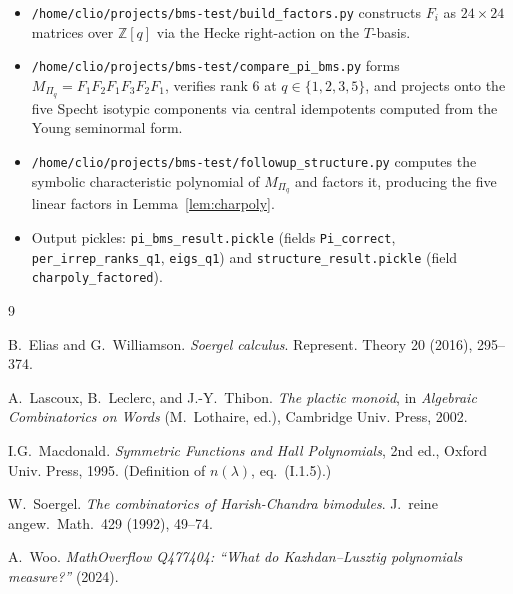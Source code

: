 \documentclass[11pt]{article}
\theoremstyle{definition}
\begin{document}
\begin{itemize}
\item \texttt{/home/clio/projects/bms-test/build\_factors.py} constructs
$F_i$ as $24\times 24$ matrices over $\mathbb{Z}[q]$ via the Hecke
right-action on the $T$-basis.

\item \texttt{/home/clio/projects/bms-test/compare\_pi\_bms.py} forms
$M_{\Pi_q} = F_1 F_2 F_1 F_3 F_2 F_1$, verifies rank $6$ at
$q \in \{1,2,3,5\}$, and projects onto the five Specht isotypic components
via central idempotents computed from the Young seminormal form.

\item \texttt{/home/clio/projects/bms-test/followup\_structure.py}
computes the symbolic characteristic polynomial of $M_{\Pi_q}$ and factors
it, producing the five linear factors in Lemma~\ref{lem:charpoly}.

\item Output pickles: \texttt{pi\_bms\_result.pickle} (fields
\texttt{Pi\_correct}, \texttt{per\_irrep\_ranks\_q1},
\texttt{eigs\_q1}) and \texttt{structure\_result.pickle} (field
\texttt{charpoly\_factored}).
\end{itemize}

\begin{thebibliography}{9}

 B.~Elias and G.~Williamson.
\emph{Soergel calculus}. Represent. Theory 20 (2016), 295--374.

 A.~Lascoux, B.~Leclerc, and J.-Y.~Thibon.
\emph{The plactic monoid}, in \emph{Algebraic Combinatorics on Words} (M.~Lothaire, ed.),
Cambridge Univ. Press, 2002.

 I.G.~Macdonald.
\emph{Symmetric Functions and Hall Polynomials}, 2nd ed., Oxford Univ. Press, 1995.
(Definition of $n(\lambda)$, eq.~(I.1.5).)

 W.~Soergel.
\emph{The combinatorics of Harish-Chandra bimodules}. J.\ reine angew.\ Math.\
429 (1992), 49--74.

 A.~Woo.
\emph{MathOverflow Q477404: ``What do Kazhdan--Lusztig polynomials measure?''}
(2024).

\end{thebibliography}
\end{document}
